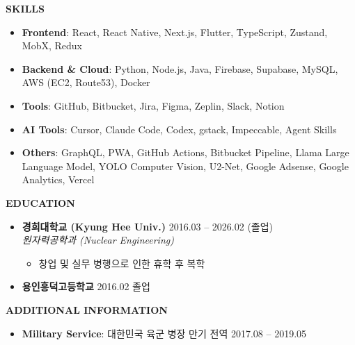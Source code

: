\documentclass[a4paper, 11pt]{article}
\newcommand{\csection}[2]{
    \vspace{12pt}
    {\Large\textbf{#1}} \hrulefill \\ \vspace{3pt}
    #2
}
\begin{document}
\vspace{8pt}
\csection{SKILLS}{
    \begin{itemize}[leftmargin=*, noitemsep]
        \item \textbf{Frontend}: React, React Native, Next.js, Flutter, TypeScript, Zustand, MobX, Redux
        \item \textbf{Backend \& Cloud}: Python, Node.js, Java, Firebase, Supabase, MySQL, AWS (EC2, Route53), Docker
        \item \textbf{Tools}: GitHub, Bitbucket, Jira, Figma, Zeplin, Slack, Notion
        \item \textbf{AI Tools}: Cursor, Claude Code, Codex, gstack, Impeccable, Agent Skills
        \item \textbf{Others}: GraphQL, PWA, GitHub Actions, Bitbucket Pipeline, Llama Large Language Model, YOLO Computer Vision, U2-Net, Google Adsense, Google Analytics, Vercel
    \end{itemize}
}

\csection{EDUCATION}{
    \begin{itemize}[leftmargin=*, itemsep=2pt]
        \item \textbf{경희대학교 (Kyung Hee Univ.)} \hfill 2016.03 -- 2026.02 (졸업) \\
        \textit{원자력공학과 (Nuclear Engineering)}
        \begin{itemize}[label={}, leftmargin=10pt, topsep=2pt]
             \item \small{창업 및 실무 병행으로 인한 휴학 후 복학}
        \end{itemize}
        
        \item \textbf{용인흥덕고등학교} \hfill 2016.02 졸업
    \end{itemize}
}

\vspace{5pt}

\csection{ADDITIONAL INFORMATION}{
    \begin{itemize}[leftmargin=*, noitemsep]
        \item \textbf{Military Service}: 대한민국 육군 병장 만기 전역 \hfill 2017.08 -- 2019.05
    \end{itemize}
}
\end{document}
